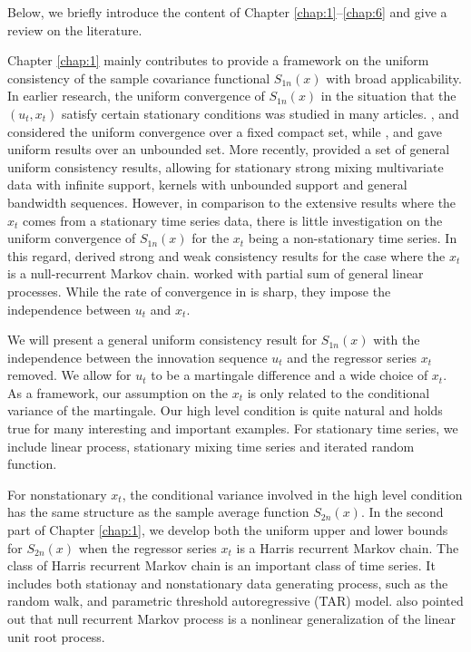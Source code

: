Below, we briefly introduce the content of Chapter \ref{chap:1}--\ref{chap:6} and give a review on the literature. 

Chapter \ref{chap:1} mainly contributes to provide a framework on the uniform consistency of the sample covariance functional $S_{1n}(x)$ with broad applicability. In earlier research, the uniform convergence of $S_{1n}(x)$ in the situation that the $(u_t, x_t)$ satisfy certain stationary conditions was studied in many articles. \cite{liero1989}, \cite{peligrad1992} and \cite{nzedoukhan2004} considered the uniform convergence over a fixed compact set, while \cite{masry1996}, \cite{bosq1998} and \cite{fanyao2003} gave uniform results over an unbounded set. More recently, \cite{hansen2008} provided a set of general uniform consistency results, allowing for stationary strong mixing multivariate data with infinite support, kernels with unbounded support and general bandwidth sequences. However, in comparison to the extensive results where the  $x_t$ comes from a stationary time series data, there is little investigation on the uniform convergence of $S_{1n}(x)$ for the $x_t$ being a non-stationary time series. In this regard, \cite{gaolitjostheim2011} derived strong and weak consistency results for the case where the $x_t$ is a null-recurrent Markov chain. \cite{wangwang2012} worked  with partial sum of general linear processes. While the rate of convergence   in \cite{gaolitjostheim2011} is sharp,  they impose the independence between $u_t$ and $x_t$.

We will present a general uniform consistency  result for $S_{1n}(x)$ with the independence between the innovation sequence $u_t$ and the regressor series $x_t$ removed. We allow for $u_t$ to be a martingale difference and a wide choice of $x_t$. As a framework,  our  assumption on the $x_t$ is only related to the conditional variance of the  martingale. Our high level condition is quite natural and holds true for many interesting and important examples. For stationary time series, we include linear process, stationary mixing time series and iterated random function.

For nonstationary $x_t$, the conditional variance involved in the high level condition has the same structure as the sample average function $S_{2n}(x)$. In the second part of Chapter \ref{chap:1}, we develop both the uniform upper and lower bounds for $S_{2n}(x)$ when the regressor series $x_t$ is a  Harris recurrent Markov chain. The class of Harris recurrent Markov chain is an important class of time series. It includes both stationay and nonstationary data generating process, such as the random walk, and parametric threshold autoregressive (TAR) model. \cite{myklebustkarlsentjostheim2012} also pointed out that null recurrent Markov process is a nonlinear generalization of the linear unit root process.

